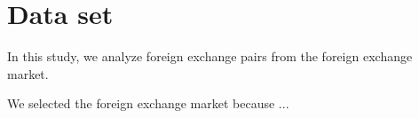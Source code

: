 \section{Data set}\label{sec:data_set}

In this study, we analyze foreign exchange pairs from the foreign exchange market.

We selected the foreign exchange market because ...




